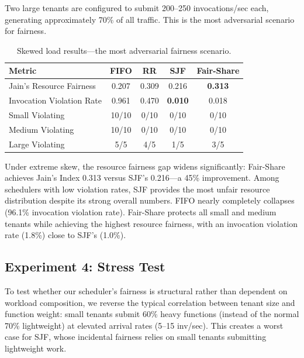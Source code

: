 \documentclass[runningheads]{llncs}
\begin{document}
Two large tenants are configured to submit 200--250 invocations/sec each, generating approximately 70\% of all traffic. This is the most adversarial scenario for fairness.

\begin{table}[!ht]
\centering
\caption{Skewed load results---the most adversarial fairness scenario.}\label{tab:skewed}
\small
\begin{tabular}{@{}lcccc@{}}
\toprule
\textbf{Metric} & \textbf{FIFO} & \textbf{RR} & \textbf{SJF} & \textbf{Fair-Share} \\
\midrule
Jain's Resource Fairness & 0.207 & 0.309 & 0.216 & \textbf{0.313} \\
Invocation Violation Rate & 0.961 & 0.470 & \textbf{0.010} & 0.018 \\
\midrule
Small Violating & 10/10 & 0/10 & 0/10 & 0/10 \\
Medium Violating & 10/10 & 0/10 & 0/10 & 0/10 \\
Large Violating & 5/5 & 4/5 & 1/5 & 3/5 \\
\bottomrule
\end{tabular}
\end{table}

Under extreme skew, the resource fairness gap widens significantly: Fair-Share achieves Jain's Index 0.313 versus SJF's 0.216---a 45\% improvement. Among schedulers with low violation rates, SJF provides the most unfair resource distribution despite its strong overall numbers. FIFO nearly completely collapses (96.1\% invocation violation rate). Fair-Share protects all small and medium tenants while achieving the highest resource fairness, with an invocation violation rate (1.8\%) close to SJF's (1.0\%).

\subsection{Experiment 4: Stress Test}

To test whether our scheduler's fairness is structural rather than dependent on workload composition, we reverse the typical correlation between tenant size and function weight: small tenants submit 60\% heavy functions (instead of the normal 70\% lightweight) at elevated arrival rates (5--15 inv/sec). This creates a worst case for SJF, whose incidental fairness relies on small tenants submitting lightweight work.
\end{document}
